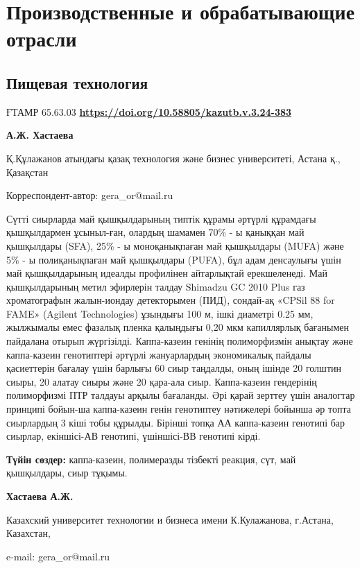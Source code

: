 \let\cleardoublepage\clearpage
\part{Производственные и обрабатывающие отрасли}
\chapter{Пищевая технология}
ҒТАМР 65.63.03
\hfill {\bfseries \href{https://doi.org/10.58805/kazutb.v.3.24-383}{https://doi.org/10.58805/kazutb.v.3.24-383}}


\begin{center}

{\bfseries А.Ж. Хастаева}

Қ.Құлажанов атындағы қазақ технология және бизнес университеті, Астана қ., Қазақстан
\end{center}

\envelope Корреспондент-автор: gera\_or@mail.ru\vspace{0.5cm}

Сүтті сиырларда май қышқылдарының типтік құрамы әртүрлі құрамдағы
қышқылдармен ұсыныл-ған, олардың шамамен 70\% - ы қаныққан май қышқылдары
(SFA), 25\% - ы моноқанықпаған май қышқылдары (MUFA) және 5\% - ы
полиқанықпаған май қышқылдары (PUFA), бұл адам денсаулығы үшін май
қышқылдарының идеалды профилінен айтарлықтай ерекшеленеді. Май
қышқылдарының метил эфирлерін талдау Shimadzu GC 2010 Plus газ
хроматографын жалын-иондау детекторымен (ПИД), сондай-ақ «CPSil 88 for
FAME» (Agilent Technologies) ұзындығы 100 м, ішкі диаметрі 0.25 мм,
жылжымалы емес фазалық пленка қалыңдығы 0,20 мкм капиллярлық бағанымен
пайдалана отырып жүргізілді. Каппа-казеин генінің полиморфизмін анықтау
және каппа-казеин генотиптері әртүрлі жануарлардың экономикалық пайдалы
қасиеттерін бағалау үшін барлығы 60 сиыр таңдалды, оның ішінде 20
голштин сиыры, 20 алатау сиыры және 20 қара-ала сиыр. Каппа-казеин
гендерінің полиморфизмі ПТР талдауы арқылы бағаланды. Әрі қарай зерттеу
үшін аналогтар принципі бойын-ша каппа-казеин генін генотиптеу нәтижелері
бойынша әр топта сиырлардың 3 кіші тобы құрылды. Бірінші топқа АА
каппа-казеин генотипі бар сиырлар, екіншісі-АВ генотипі, үшіншісі-ВВ
генотипі кірді.

{\bfseries Түйін сөздер:} каппа-казеин, полимеразды тізбекті реакция, сүт,
май қышқылдары, сиыр тұқымы.

\begin{center}

{\bfseries Хастаева А.Ж.}

Казахский университет технологии и бизнеса имени К.Кулажанова, г.Астана,
Казахстан,

e-mail: gera\_or@mail.ru
\end{center}


